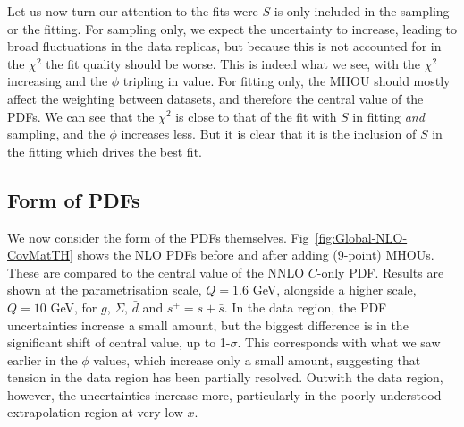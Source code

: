 Let us now turn our attention to the fits were $S$ is only included in the sampling or the fitting. For sampling only, we expect the uncertainty to increase, leading to broad fluctuations in the data replicas, but because this is not accounted for in the $\chi^2$ the fit quality should be worse. This is indeed what we see, with the $\chi^2$ increasing and the $\phi$ tripling in value.  For fitting only, the MHOU should mostly affect the weighting between datasets, and therefore the central value of the PDFs. We can see that the $\chi^2$ is close to that of the fit with $S$ in fitting \textit{and} sampling, and the $\phi$ increases less. But it is clear that it is the inclusion of $S$ in the fitting which drives the best fit.

\subsection{Form of PDFs}
We now consider the form of the PDFs themselves. Fig~\ref{fig:Global-NLO-CovMatTH} shows the NLO PDFs before and after adding (9-point) MHOUs. These are compared to the central value of the NNLO $C$-only PDF. Results are shown at the parametrisation scale, $Q=1.6$ GeV, alongside a higher scale, $Q=10$ GeV, for $g$, $\Sigma$, $\bar{d}$ and $s^+ = s + \bar{s}$. In the data region, the PDF uncertainties increase a small amount, but the biggest difference is in the significant shift of central value, up to 1-$\sigma$. This corresponds with what we saw earlier in the $\phi$ values, which increase only a small amount, suggesting that tension in the data region has been partially resolved. Outwith the data region, however, the uncertainties increase more, particularly in the poorly-understood extrapolation region at very low $x$.

